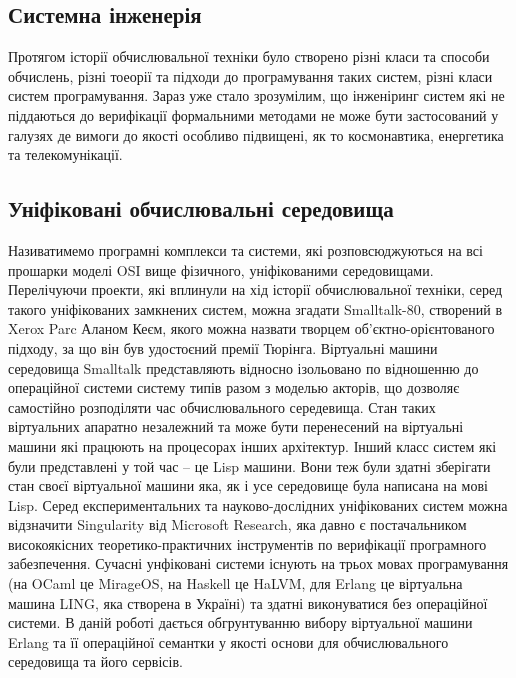 \documentclass[11pt,oneside]{article}
\begin{document}
\vspace{1cm}


\subsection{Системна інженерія}

   Протягом історії обчислювальної техніки було створено різні класи та способи обчислень,
   різні тоеорії та підходи до програмування таких систем, різні класи систем програмування.
   Зараз уже стало зрозумілим, що інженіринг систем які не піддаються до верифікації
   формальними методами не може бути застосований у галузях де вимоги до якості
   особливо підвищені, як то космонавтика, енергетика та телекомунікації.

\subsection{Уніфіковані обчислювальні середовища}

   Називатимемо програмні комплекси та системи, які розповсюджуються на всі прошарки моделі OSI вище фізичного,
   уніфікованими середовищами. Перелічуючи проекти, які вплинули на хід історії
   обчислювальної техніки, серед такого уніфікованих замкнених систем, можна згадати Smalltalk-80,
   створений в Xerox Parc Аланом Кеєм, якого можна назвати творцем об'єктно-орієнтованого підходу, за що він був
   удостоєний премії Тюрінга. Віртуальні машини середовища Smalltalk представляють відносно ізольовано
   по відношенню до операційної системи систему типів разом з моделью акторів, що дозволяє
   самостійно розподіляти час обчислювального середевища. Стан таких віртуальних апаратно незалежний
   та може бути перенесений на віртуальні машини які працюють на процесорах інших архітектур.
   Інший класс систем які були представлені у той час -- це Lisp машини. Вони теж були
   здатні зберігати стан своєї віртуальної машини яка,
   як і усе середовище була написана на мові Lisp. Серед експериментальних та науково-дослідних
   уніфікованих систем можна відзначити Singularity від Microsoft Research, яка давно є постачальником
   високоякісних теоретико-практичних інструментів по верифікації програмного забезпечення.
   Сучасні унфіковані системи існують на трьох мовах програмування (на OCaml це MirageOS,
   на Haskell це HaLVM, для Erlang це віртуальна машина LING, яка створена в Україні) та
   здатні виконуватися без операційної системи. В даній роботі дається обгрунтуванню вибору
   віртуальної машини Erlang та її операційної семантки у якості основи для обчислювального
   середовища та його сервісів.
\end{document}
